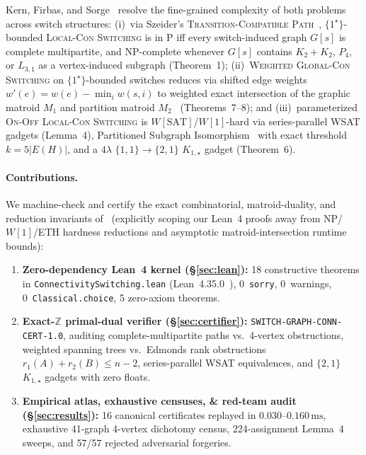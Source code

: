 \documentclass[11pt,twocolumn]{article}
\newcommand{\ZZ}{\mathbb{Z}}
\begin{document}
Kern, Firbas, and Sorge~\cite{kern2026switching} resolve the fine-grained complexity of both problems across switch structures: (i)~via Szeider's \textsc{Transition-Compatible Path}~\cite{szeider2003finding}, $\{1^\star\}$-bounded \textsc{Local-Con Switching} is in $\mathrm{P}$ iff every switch-induced graph $G[s]$ is complete multipartite, and $\mathrm{NP}$-complete whenever $G[s]$ contains $K_2{+}K_2$, $P_4$, or $L_{3,1}$ as a vertex-induced subgraph (Theorem~1); (ii)~\textsc{Weighted Global-Con Switching} on $\{1^\star\}$-bounded switches reduces via shifted edge weights $w'(e) = w(e) - \min_i w(s,i)$ to weighted exact intersection of the graphic matroid $M_1$ and partition matroid $M_2$~\cite{oxley2011matroid} (Theorems~7--8); and (iii)~parameterized \textsc{On-Off Local-Con Switching} is $W[\mathrm{SAT}]$/$W[1]$-hard via series-parallel WSAT gadgets (Lemma~4), Partitioned Subgraph Isomorphism~\cite{marx2010can} with exact threshold $k = 5|E(H)|$, and a $4\lambda$ $\{1,1\}\to\{2,1\}$ $K_{1,\star}$ gadget (Theorem~6).

\paragraph{Contributions.}
We machine-check and certify the exact combinatorial, matroid-duality, and reduction invariants of~\cite{kern2026switching} (explicitly scoping our Lean~4 proofs away from $\mathrm{NP}$/$W[1]$/ETH hardness reductions and asymptotic matroid-intersection runtime bounds):
\begin{enumerate}[leftmargin=*,nosep]
  \item \textbf{Zero-dependency Lean~4 kernel (\S\ref{sec:lean}):} 18 constructive theorems in \texttt{ConnectivitySwitching.lean} (Lean~4.35.0~\cite{demoura2021lean4}), 0~\texttt{sorry}, 0~warnings, 0~\texttt{Classical.choice}, 5 zero-axiom theorems.
  \item \textbf{Exact-$\ZZ$ primal-dual verifier (\S\ref{sec:certifier}):} \texttt{SWITCH-GRAPH-CONN-CERT-1.0}, auditing complete-multipartite paths vs.\ 4-vertex obstructions, weighted spanning trees vs.\ Edmonds rank obstructions $r_1(A)+r_2(B) \le n-2$, series-parallel WSAT equivalences, and $\{2,1\}$ $K_{1,\star}$ gadgets with zero floats.
  \item \textbf{Empirical atlas, exhaustive censuses, \& red-team audit (\S\ref{sec:results}):} 16 canonical certificates replayed in $0.030$--$0.160\,\mathrm{ms}$, exhaustive 41-graph 4-vertex dichotomy census, 224-assignment Lemma~4 sweeps, and 57/57 rejected adversarial forgeries.
\end{enumerate}
\end{document}
